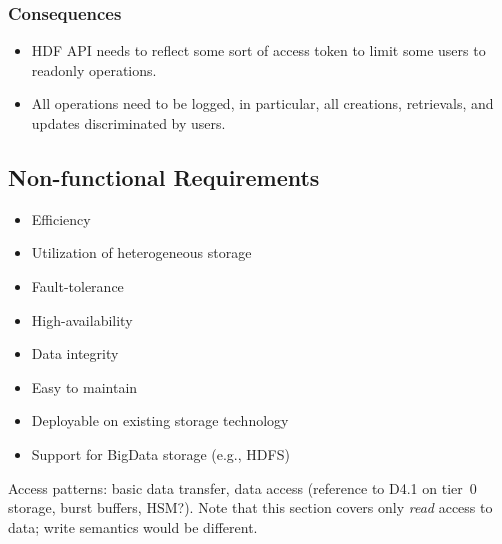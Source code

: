 \documentclass{../../template/esiwace-report}
\begin{document}
\subsubsection{Consequences}

\begin{itemize}
\item HDF API needs to reflect some sort of access token to limit some users to readonly operations.
\item All operations need to be logged, in particular, all creations, retrievals, and updates discriminated by users.
\end{itemize}





\subsection{Non-functional Requirements}


\begin{itemize}
\item Efficiency
\item Utilization of heterogeneous storage
\item Fault-tolerance
\item High-availability
\item Data integrity
\item Easy to maintain
\item Deployable on existing storage technology
\item Support for BigData storage (e.g., HDFS)
\end{itemize}



Access patterns: basic data transfer, data access (reference to D4.1 on tier~0 storage, burst buffers, HSM?).  Note that
this section covers only \emph{read} access to data; write semantics would be different.
\end{document}
